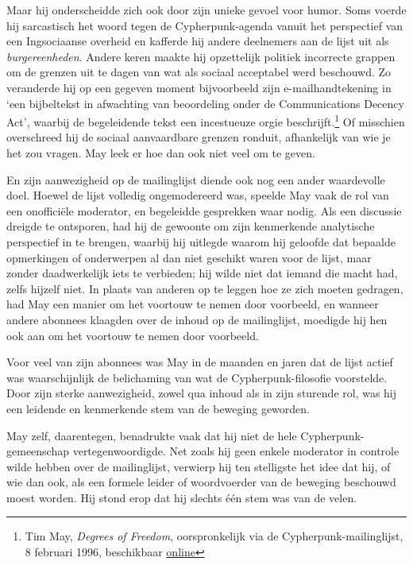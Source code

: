 \documentclass[
  a5paper,
  smalldemyvopaper,11pt,twoside,onecolumn,openright,extrafontsizes,
hidelinks]{memoir}
\begin{document}
Maar hij onderscheidde zich ook door zijn unieke gevoel voor humor. Soms
voerde hij sarcastisch het woord tegen de Cypherpunk-agenda vanuit het
perspectief van een Ingsociaanse overheid en kafferde hij andere
deelnemers aan de lijst uit als \emph{burgereenheden}. Andere keren
maakte hij opzettelijk politiek incorrecte grappen om de grenzen uit te
dagen van wat als sociaal acceptabel werd beschouwd. Zo veranderde hij
op een gegeven moment bijvoorbeeld zijn e-mailhandtekening in `een
bijbeltekst in afwachting van beoordeling onder de Communications
Decency Act', waarbij de begeleidende tekst een incestueuze orgie
beschrijft.\footnote{Tim May, \emph{Degrees of Freedom}, oorspronkelijk
  via de Cypherpunk-mailinglijst, 8 februari 1996, beschikbaar
  \href{https://cypherpunks.venona.com/date/1996/02/msg00637.html}{online}}
Of misschien overschreed hij de sociaal aanvaardbare grenzen ronduit,
afhankelijk van wie je het zou vragen. May leek er hoe dan ook niet veel
om te geven.

En zijn aanwezigheid op de mailinglijst diende ook nog een ander
waardevolle doel. Hoewel de lijst volledig ongemodereerd was, speelde
May vaak de rol van een onofficiële moderator, en begeleidde gesprekken
waar nodig. Als een discussie dreigde te ontsporen, had hij de gewoonte
om zijn kenmerkende analytische perspectief in te brengen, waarbij hij
uitlegde waarom hij geloofde dat bepaalde opmerkingen of onderwerpen al
dan niet geschikt waren voor de lijst, maar zonder daadwerkelijk iets te
verbieden; hij wilde niet dat iemand die macht had, zelfs hijzelf niet.
In plaats van anderen op te leggen hoe ze zich moeten gedragen, had May
een manier om het voortouw te nemen door voorbeeld, en wanneer andere
abonnees klaagden over de inhoud op de mailinglijst, moedigde hij hen
ook aan om het voortouw te nemen door voorbeeld.

Voor veel van zijn abonnees was May in de maanden en jaren dat de lijst
actief was waarschijnlijk de belichaming van wat de Cypherpunk-filosofie
voorstelde. Door zijn sterke aanwezigheid, zowel qua inhoud als in zijn
sturende rol, was hij een leidende en kenmerkende stem van de beweging
geworden.

May zelf, daarentegen, benadrukte vaak dat hij niet de hele
Cypherpunk-gemeenschap vertegenwoordigde. Net zoals hij geen enkele
moderator in controle wilde hebben over de mailinglijst, verwierp hij
ten stelligste het idee dat hij, of wie dan ook, als een formele leider
of woordvoerder van de beweging beschouwd moest worden. Hij stond erop
dat hij slechts één stem was van de velen.
\end{document}
